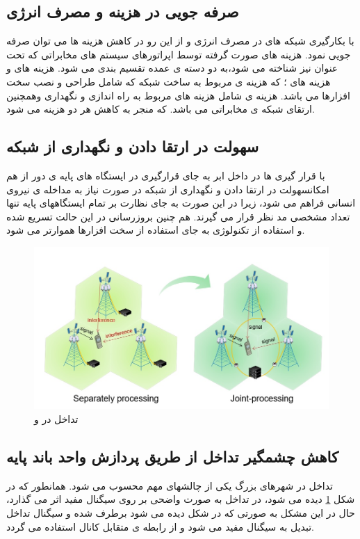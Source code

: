 \subsection{صرفه جویی در هزینه و مصرف انرژی }
با بکارگیری شبکه های  در مصرف انرژی و از این
رو در کاهش هزینه ها می توان صرفه جویی نمود.
هزینه
های صورت گرفته توسط اپراتورهای سیستم های مخابراتی
که تحت عنوان  نیز شناخته می شود،به دو دسته
ی عمده تقسیم بندی می شود. هزینه های  و
هزینه های ؛
که هزینه ی  مربوط به ساخت شبکه که شامل طراحی و نصب سخت افزارها می باشد. هزینه ی  شامل هزینه های مربوط به راه اندازی و نگهداری وهمچنین
ارتقای شبکه ی مخابراتی می باشد. که  منجر به کاهش هر دو هزینه می شود.
\subsection{سهولت در ارتقا دادن و نگهداری از شبکه}
با قرار گیری   ها در داخل ابر به جای قرارگیری در
ایستگاه های پایه ی دور از هم امکانسهولت در ارتقا دادن و نگهداری از شبکه در صورت نیاز به مداخله ی نیروی انسانی
فراهم می شود، زیرا در این صورت به جای نظارت بر تمام
ایستگاههای پایه تنها تعداد مشخصی  مد نظر
قرار می گیرند. هم چنین بروزرسانی  در این حالت
تسریع شده و استفاده از تکنولوژی  به جای استفاده از
سخت افزارها هموارتر می شود.
\begin{figure}
  \centering
    \includegraphics[width=\textwidth]{./pic1/c55}
  \caption{تداخل در  و  \cite{WinNT}}
  \label{fig:c55}
\end{figure}
\subsection{کاهش چشمگیر تداخل از طریق پردازش واحد باند پایه }
تداخل در شهرهای بزرگ یکی از چالشهای مهم محسوب می شود. \newline
همانطور که در شکل \ref{fig:c55} دیده می شود، در  تداخل به صورت واضحی بر روی سیگنال مفید اثر می گذارد، حال در  این مشکل به صورتی که در شکل دیده می شود برطرف شده و سیگنال تداخل تبدیل به سیگنال مفید می شود و از رابطه ی متقابل کانال   استفاده می گردد.

